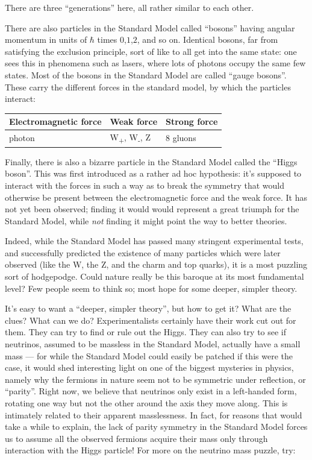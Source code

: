 \documentclass{article}
\begin{document}
There are three ``generations'' here, all rather similar to each other.

There are also particles in the Standard Model called ``bosons'' having
angular momentum in units of \(\hbar\) times \(0\),\(1\),\(2\), and so
on. Identical bosons, far from satisfying the exclusion principle, sort
of like to all get into the same state: one sees this in phenomena such
as lasers, where lots of photons occupy the same few states. Most of the
bosons in the Standard Model are called ``gauge bosons''. These carry
the different forces in the standard model, by which the particles
interact:

\begin{longtable}[]{@{}lll@{}}
\toprule
Electromagnetic force & Weak force & Strong force\tabularnewline
\midrule
\endhead
photon & W\textsubscript{+}, W\textsubscript{-}, Z & 8
gluons\tabularnewline
\bottomrule
\end{longtable}

Finally, there is also a bizarre particle in the Standard Model called
the ``Higgs boson''. This was first introduced as a rather ad hoc
hypothesis: it's supposed to interact with the forces in such a way as
to break the symmetry that would otherwise be present between the
electromagnetic force and the weak force. It has not yet been observed;
finding it would would represent a great triumph for the Standard Model,
while \emph{not} finding it might point the way to better theories.

Indeed, while the Standard Model has passed many stringent experimental
tests, and successfully predicted the existence of many particles which
were later observed (like the W, the Z, and the charm and top quarks),
it is a most puzzling sort of hodgepodge. Could nature really be this
baroque at its most fundamental level? Few people seem to think so; most
hope for some deeper, simpler theory.

It's easy to want a ``deeper, simpler theory'', but how to get it? What
are the clues? What can we do? Experimentalists certainly have their
work cut out for them. They can try to find or rule out the Higgs. They
can also try to see if neutrinos, assumed to be massless in the Standard
Model, actually have a small mass --- for while the Standard Model could
easily be patched if this were the case, it would shed interesting light
on one of the biggest mysteries in physics, namely why the fermions in
nature seem not to be symmetric under reflection, or ``parity''. Right
now, we believe that neutrinos only exist in a left-handed form,
rotating one way but not the other around the axis they move along. This
is intimately related to their apparent masslessness. In fact, for
reasons that would take a while to explain, the lack of parity symmetry
in the Standard Model forces us to assume all the observed fermions
acquire their mass only through interaction with the Higgs particle! For
more on the neutrino mass puzzle, try:
\end{document}
